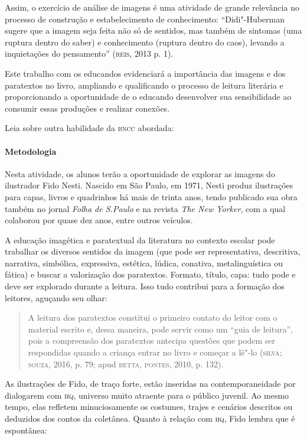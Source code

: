 \documentclass[11pt]{extarticle}
\begin{document}
Assim, o exercício de análise de imagens é uma atividade de grande
relevância no processo de construção e estabelecimento de conhecimento:
``Didi"-Huberman sugere que a imagem seja feita não só de sentidos, mas
também de sintomas (uma ruptura dentro do saber) e conhecimento (ruptura
dentro do caos), levando a inquietações do pensamento'' (\textsc{reis}, 2013 p. 1).

Este trabalho com os educandos evidenciará a importância das imagens e
dos paratextos no livro, ampliando e qualificando o processo de leitura
literária e proporcionando a oportunidade de o educando desenvolver sua
sensibilidade ao consumir essas produções e realizar conexões.

Leia sobre outra habilidade da \textsc{bncc} abordada:

\paragraph{Metodologia}
Nesta atividade, os alunos terão a oportunidade de explorar as imagens
do ilustrador Fido Nesti. Nascido em São Paulo, em 1971, Nesti produz
ilustrações para capas, livros e quadrinhos há mais de trinta anos,
tendo publicado sua obra também no jornal \emph{Folha de S.Paulo} e na
revista \emph{The New Yorker}, com a qual colaborou por quase dez anos,
entre outros veículos.

A educação imagética e paratextual da literatura no contexto escolar
pode trabalhar os diversos sentidos da imagem (que pode ser
representativa, descritiva, narrativa, simbólica, expressiva, estética,
lúdica, conativa, metalinguística ou fática) e buscar a valorização dos
paratextos. Formato, título, capa: tudo pode e deve ser explorado
durante a leitura. Isso tudo contribui para a formação dos leitores,
aguçando seu olhar:

\begin{quote}
A leitura dos paratextos constitui o primeiro contato do leitor com o
material escrito e, dessa maneira, pode servir como um ``guia de
leitura'', pois a compreensão dos paratextos antecipa questões que podem
ser respondidas quando a criança entrar no livro e começar a lê"-lo
(\textsc{silva}; \textsc{souza}, 2016, p. 79; apud \textsc{betta}, \textsc{pontes}, 2010, p. 132).
\end{quote}

As ilustrações de Fido, de traço forte, estão inseridas na
contemporaneidade por dialogarem com \textsc{hq}, universo muito atraente para o
público juvenil. Ao mesmo tempo, elas refletem minuciosamente os
costumes, trajes e cenários descritos ou deduzidos dos contos da
coletânea. Quanto à relação com \textsc{hq}, Fido lembra que é espontânea:
\end{document}
